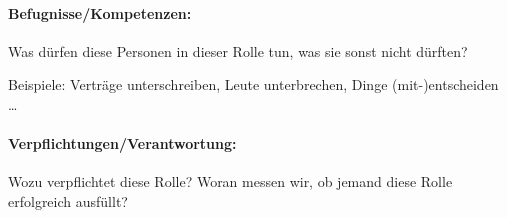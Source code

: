 \paragraph{Befugnisse/Kompetenzen:} Was dürfen diese Personen in dieser Rolle tun, was sie sonst nicht dürften?

Beispiele: Verträge unterschreiben, Leute unterbrechen, Dinge (mit-)entscheiden \ldots

\paragraph{Verpflichtungen/Verantwortung:} Wozu verpflichtet diese Rolle? Woran messen wir, ob jemand diese Rolle erfolgreich ausfüllt?
